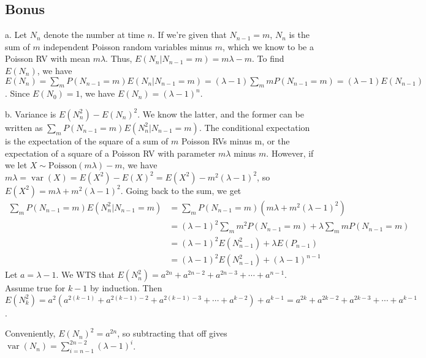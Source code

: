 \documentclass{article}
\DeclareMathOperator{\var}{var}
\begin{document}
\subsection*{Bonus}
a. Let $N_n$ denote the number at time $n$. If we're given that $N_{n-1}=m$, $N_n$ is the sum of $m$ independent Poisson random variables minus $m$, which we know to be a Poisson RV with mean $m\lambda$. Thus, $E(N_n|N_{n-1}=m)=m\lambda-m$. To find $E(N_n)$, we have $E(N_n)=\sum_m P(N_{n-1}=m)E(N_n|N_{n-1}=m)=(\lambda-1)\sum_mmP(N_{n-1}=m)=(\lambda-1) E(N_{n-1})$. Since $E(N_0)=1$, we have $E(N_n)=(\lambda-1)^n$.

b. Variance is $E(N_n^2)-E(N_n)^2$. We know the latter, and the former can be written as $\sum_m P(N_{n-1}=m)E(N_n^2|N_{n-1}=m)$. The conditional expectation is the expectation of the square of a sum of $m$ Poisson RVs minus m, or the expectation of a square of a Poisson RV with parameter $m\lambda$ minus $m$. However, if we let $X\sim\text{Poisson}(m\lambda)-m$, we have $m\lambda=\var(X)=E(X^2)-E(X)^2=E(X^2)-m^2(\lambda-1)^2$, so $E(X^2)=m\lambda+m^2(\lambda-1)^2$. Going back to the sum, we get 
\begin{align*}
    \sum_m P(N_{n-1}=m)E(N_n^2|N_{n-1}=m)&=\sum_m P(N_{n-1}=m)(m\lambda+m^2(\lambda-1)^2)\\
    &=(\lambda-1)^2\sum_mm^2P(N_{n-1}=m)+\lambda\sum_mmP(N_{n-1}=m)\\
    &=(\lambda-1)^2E(N_{n-1}^2)+\lambda E(P_{n-1})\\
    &=(\lambda-1)^2E(N_{n-1}^2)+(\lambda-1)^{n-1}
\end{align*}
Let $a=\lambda-1$. We WTS that $E(N_n^2)=a^{2n}+a^{2n-2}+a^{2n-3}+\cdots+a^{n-1}$. Assume true for $k-1$ by induction. Then $E(N_k^2)=a^2(a^{2(k-1)}+a^{2(k-1)-2}+a^{2(k-1)-3}+\cdots+a^{k-2})+a^{k-1}=a^{2k}+a^{2k-2}+a^{2k-3}+\cdots+a^{k-1}$.

Conveniently, $E(N_n)^2=a^{2n}$, so subtracting that off gives $\var(N_n)=\sum_{i=n-1}^{2n-2}(\lambda-1)^i$.
\end{document}
